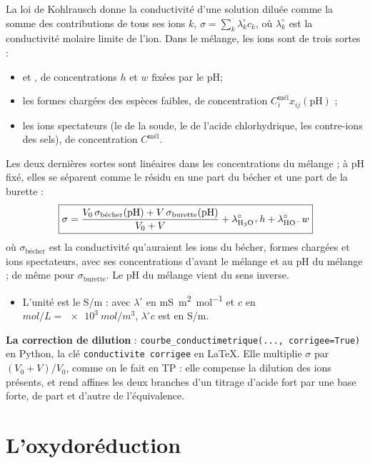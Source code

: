 \documentclass[a4paper,11pt]{article}
\newcommand\rmxcons[1]{\begin{tcolorbox}[rmq, rouge, left=3pt, fontupper=\small\itshape]\begin{itemize}[label=\ding{43}, leftmargin=*, topsep=0pt, itemsep=2pt]#1\end{itemize}\end{tcolorbox}}
\newcommand\gras[1]{\textbf{#1}}
\newcommand\rsltm[1]{\boxed{#1}}
\newcommand\pH{\ensuremath{\mathrm{pH}}\xspace}
\newcommand\code[1]{\texttt{#1}}
\begin{document}
La loi de Kohlrausch donne la conductivité d'une solution diluée comme la somme des contributions de tous ses ions $k$, $\sigma=\sum_k\lambda_k^\circ c_k$, où $\lambda_k^\circ$ est la conductivité molaire limite de l'ion.
Dans le mélange, les ions sont de trois sortes :
\begin{itemize}
\item {} et , de concentrations $h$ et $w$ fixées par le \pH ;
\item les formes chargées des espèces faibles, de concentration $C^\text{mél}_ix_{ij}(\pH)$ ;
\item les ions spectateurs (le  de la soude, le  de l'acide chlorhydrique, les contre-ions des sels), de concentration $C^\text{mél}$.
\end{itemize}
Les deux dernières sortes sont linéaires dans les concentrations du mélange ; à \pH fixé, elles se séparent comme le résidu en une part du bécher et une part de la burette :
\begin{align}
\rsltm{\sigma=\frac{V_0\,\sigma_\text{bécher}(\pH)+V\,\sigma_\text{burette}(\pH)}{V_0+V}+\lambda^\circ_{\ce{H3O+}}h+\lambda^\circ_{\ce{HO-}}w}
\end{align}
où $\sigma_\text{bécher}$ est la conductivité qu'auraient les ions du bécher, formes chargées et ions spectateurs, avec ses concentrations d'avant le mélange et au \pH du mélange ; de même pour $\sigma_\text{burette}$.
Le \pH du mélange vient du sens inverse.
\rmxcons{
\item L'unité est le \unit{S/m} : avec $\lambda^\circ$ en \unit{mS.m^2.mol^{-1}} et $c$ en $\unit{mol/L}=\qty{e3}{mol/m^3}$, $\lambda^\circ c$ est en \unit{S/m}.
}
\begin{option}
\gras{La correction de dilution} : \code{courbe\_conductimetrique(..., corrigee=True)} en Python, la clé \code{conductivite corrigee} en \LaTeX.
Elle multiplie $\sigma$ par $(V_0+V)/V_0$, comme on le fait en TP : elle compense la dilution des ions présents, et rend affines les deux branches d'un titrage d'acide fort par une base forte, de part et d'autre de l'équivalence.
\end{option}

\section{L'oxydoréduction}
\end{document}

